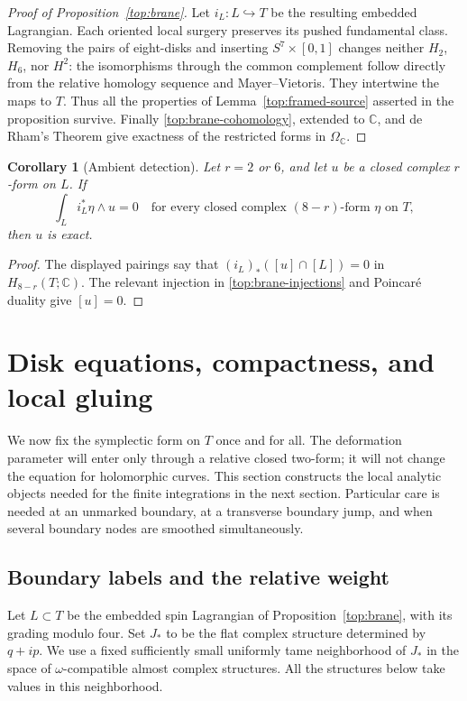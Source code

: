 \documentclass[11pt]{article}
\newtheorem{corollary}[theorem]{Corollary}
\theoremstyle{definition}
\theoremstyle{remark}
\numberwithin{equation}{section}
\begin{document}
\begin{proof}[Proof of Proposition~\ref{top:brane}]
Let $i_L:L\hookrightarrow T$ be the resulting embedded
Lagrangian.  Each oriented local surgery preserves its
pushed fundamental class.  Removing the pairs of
eight-disks and inserting $S^7\times[0,1]$ changes neither
$H_2$, $H_6$, nor $H^2$: the isomorphisms through the
common complement follow directly from the relative
homology sequence and Mayer--Vietoris.  They intertwine
the maps to $T$.  Thus all the properties of
Lemma~\ref{top:framed-source} asserted in the proposition
survive.  Finally \eqref{top:brane-cohomology}, extended
to $\mathbb C$, and de Rham's Theorem give exactness of the
restricted forms in $\Omega_{\mathbb C}$.
\end{proof}

\begin{corollary}[Ambient detection]\label{top:ambient-detection}
Let $r=2$ or $6$, and let $u$ be a closed complex $r$-form on $L$.
If
\[
 \int_L i_L^*\eta\wedge u=0
 \quad\text{for every closed complex $(8-r)$-form $\eta$ on $T$},
\]
then $u$ is exact.
\end{corollary}

\begin{proof}
The displayed pairings say that
$(i_L)_*([u]\cap[L])=0$ in $H_{8-r}(T;\mathbb C)$.
The relevant injection in \eqref{top:brane-injections}
and Poincar\'e duality give $[u]=0$.
\end{proof}

\section{Disk equations, compactness, and local gluing}
\label{local:section}

We now fix the symplectic form on $T$ once and for all.  The deformation
parameter will enter only through a relative closed two-form; it will not
change the equation for holomorphic curves.  This section constructs the
local analytic objects needed for the finite integrations in the next
section.  Particular care is needed at an unmarked boundary, at a transverse
boundary jump, and when several boundary nodes are smoothed simultaneously.

\subsection{Boundary labels and the relative weight}

Let $L\subset T$ be the embedded spin Lagrangian of
Proposition~\ref{top:brane}, with its
grading modulo four.  Set $J_*$ to be the flat complex structure determined
by $q+ip$.  We use a fixed sufficiently small uniformly tame neighborhood of
$J_*$ in the space of $\omega$-compatible almost complex structures.
All the structures below take values in this neighborhood.
\end{document}
